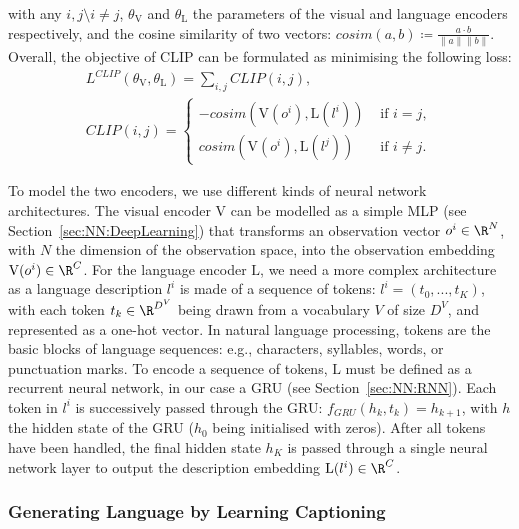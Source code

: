 with any $i,j\setminus i\neq j$, $\theta_\mathrm{V}$ and $\theta_\mathrm{L}$ the parameters of the visual and language encoders respectively, and the cosine similarity of two vectors: $cosim(a,b)\coloneq\frac{a\cdot b}{\parallel a\parallel\parallel b\parallel}$. Overall, the objective of CLIP can be formulated as minimising the following loss:
\begin{gather}
    L^{CLIP}(\theta_\mathrm{V},\theta_\mathrm{L})=\sum_{i,j}CLIP(i,j),\\
    CLIP(i,j)=
    \begin{cases}
        -cosim(\mathrm{V}(o^i),\mathrm{L}(l^i)) & \text{ if }i=j, \\
        cosim(\mathrm{V}(o^i),\mathrm{L}(l^j)) & \text{ if }i\neq j.
    \end{cases}
    \label{eq:LAMAC:CLIP}
\end{gather}

To model the two encoders, we use different kinds of neural network architectures. The visual encoder $\mathrm{V}$ can be modelled as a simple MLP (see Section~\ref{sec:NN:DeepLearning}) that transforms an observation vector $o^i\in\R^N$, with $N$ the dimension of the observation space, into the observation embedding $\mathrm{V}(o^i)\in\R^C$. For the language encoder $\mathrm{L}$, we need a more complex architecture as a language description $l^i$ is made of a sequence of tokens: $l^i=(t_0,...,t_K)$, with each token $t_k\in\R^{D^V}$ being drawn from a vocabulary $V$ of size $D^V$, and represented as a one-hot vector. In natural language processing, tokens are the basic blocks of language sequences: e.g., characters, syllables, words, or punctuation marks. To encode a sequence of tokens, $\mathrm{L}$ must be defined as a recurrent neural network, in our case a GRU (see Section~\ref{sec:NN:RNN}). Each token in $l^i$ is successively passed through the GRU: $f_{GRU}(h_k, t_k)=h_{k+1}$, with $h$ the hidden state of the GRU ($h_0$ being initialised with zeros). After all tokens have been handled, the final hidden state $h_K$ is passed through a single neural network layer to output the description embedding $\mathrm{L}(l^i)\in\R^C$. 



\subsubsection{Generating Language by Learning Captioning}\label{sec:LAMAC:Captioning}


